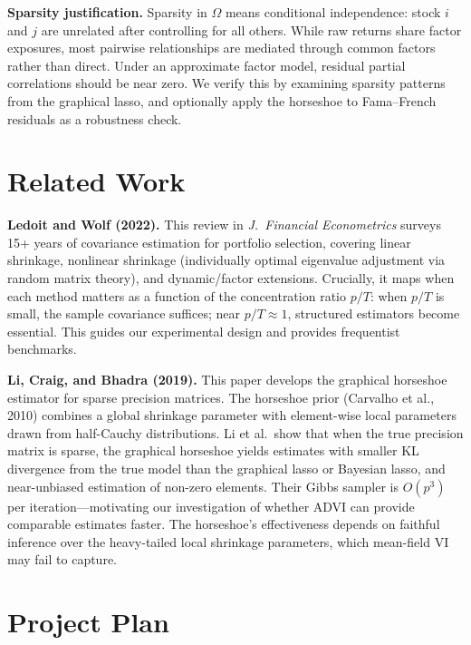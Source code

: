 \documentclass[11pt]{article}
\begin{document}
\textbf{Sparsity justification.} Sparsity in $\Omega$ means conditional independence: stock $i$ and $j$ are unrelated after controlling for all others. While raw returns share factor exposures, most pairwise relationships are mediated through common factors rather than direct. Under an approximate factor model, residual partial correlations should be near zero. We verify this by examining sparsity patterns from the graphical lasso, and optionally apply the horseshoe to Fama--French residuals as a robustness check.

\section{Related Work}

\textbf{Ledoit and Wolf (2022).} This review in \textit{J.\ Financial Econometrics} surveys 15+ years of covariance estimation for portfolio selection, covering linear shrinkage, nonlinear shrinkage (individually optimal eigenvalue adjustment via random matrix theory), and dynamic/factor extensions. Crucially, it maps when each method matters as a function of the concentration ratio $p/T$: when $p/T$ is small, the sample covariance suffices; near $p/T \approx 1$, structured estimators become essential. This guides our experimental design and provides frequentist benchmarks.

\textbf{Li, Craig, and Bhadra (2019).} This paper develops the graphical horseshoe estimator for sparse precision matrices. The horseshoe prior (Carvalho et al., 2010) combines a global shrinkage parameter with element-wise local parameters drawn from half-Cauchy distributions. Li et al.\ show that when the true precision matrix is sparse, the graphical horseshoe yields estimates with smaller KL divergence from the true model than the graphical lasso or Bayesian lasso, and near-unbiased estimation of non-zero elements. Their Gibbs sampler is $O(p^3)$ per iteration---motivating our investigation of whether ADVI can provide comparable estimates faster. The horseshoe's effectiveness depends on faithful inference over the heavy-tailed local shrinkage parameters, which mean-field VI may fail to capture.
\newpage
\section{Project Plan}
\end{document}
